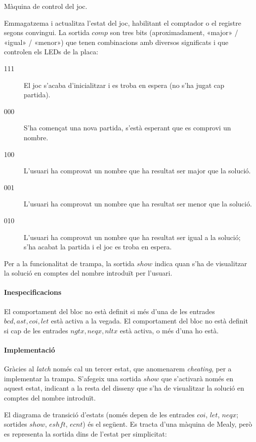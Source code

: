 Màquina de control del joc.

Emmagatzema i actualitza l'estat del joc, habilitant el comptador o el registre segons convingui.
La sortida $comp$ son tres bits (aproximadament, «major» / «igual» / «menor») que tenen
combinacions amb diversos significats i que controlen els LEDs de la placa:

\begin{description}
\item[111] El joc s'acaba d'inicialitzar i es troba en espera (no s'ha jugat cap partida).
\item[000] S'ha començat una nova partida, s'està esperant que es comprovi un nombre.
\item[100] L'usuari ha comprovat un nombre que ha resultat ser major que la solució.
\item[001] L'usuari ha comprovat un nombre que ha resultat ser menor que la solució.
\item[010] L'usuari ha comprovat un nombre que ha resultat ser igual a la solució;
s'ha acabat la partida i el joc es troba en espera.
\end{description}

Per a la funcionalitat de trampa, la sortida $show$ indica quan s'ha de visualitzar
la solució en comptes del nombre introduït per l'usuari.

\paragraph{Inespecificacions}


El comportament del bloc no està definit si més d'una de les entrades $bcd, ast, coi, let$ està activa a la vegada.
El comportament del bloc no està definit si cap de les entrades $ngtx, neqx, nltx$ està activa, o més d'una ho està.


\paragraph{Implementació}




Gràcies al \emph{latch} només cal un tercer estat, que anomenarem \emph{cheating},
per a implementar la trampa. S'afegeix una sortida $show$ que s'activarà només
en aquest estat, indicant a la resta del disseny que s'ha de visualitzar la solució
en comptes del nombre introduït.

El diagrama de transició d'estats (només depen de les entrades $coi$, $let$, $neqx$; sortides $show$, $eshft$, $ecnt$) és el següent. Es tracta
d'una màquina de Mealy, però es representa la sortida dins de l'estat per simplicitat:

